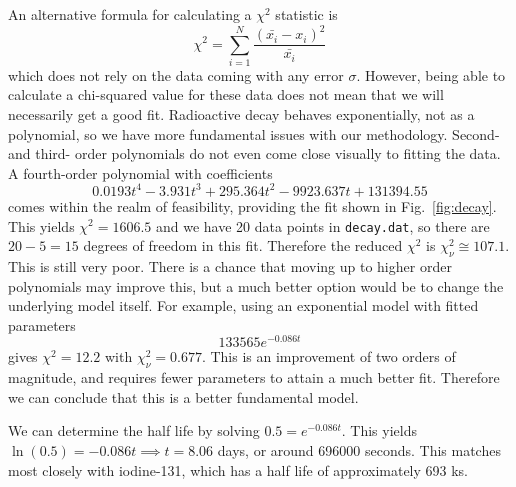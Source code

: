 \documentclass{article}
\begin{document}
\bigskip
{}
\medskip

An alternative formula for calculating a $\chi^2$ statistic is \begin{equation*}
    \chi^2 = \sum_{i=1}^N \frac{(\bar{x_i}-x_i)^2}{\bar{x_i}}
\end{equation*}
which does not rely on the data coming with any error $\sigma$. However, being able to calculate a chi-squared value for these data does not mean that we will necessarily get a good fit. Radioactive decay behaves exponentially, not as a polynomial, so we have more fundamental issues with our methodology. Second- and third- order polynomials do not even come close visually to fitting the data. A fourth-order polynomial with coefficients \begin{equation*}
    0.0193t^4 - 3.931t^3 + 295.364t^2 - 9923.637t + 131394.55
\end{equation*}
comes within the realm of feasibility, providing the fit shown in Fig.~\ref{fig:decay}. This yields $\chi^2=1606.5$ and we have 20 data points in \texttt{decay.dat}, so there are $20-5=15$ degrees of freedom in this fit. Therefore the reduced $\chi^2$ is $\chi_\nu^2 \cong 107.1$. This is still very poor. There is a chance that moving up to higher order polynomials may improve this, but a much better option would be to change the underlying model itself. For example, using an exponential model with fitted parameters \begin{equation*}
    133565e^{-0.086t}
\end{equation*}
gives $\chi^2=12.2$ with $\chi_\nu^2 = 0.677$. This is an improvement of two orders of magnitude, and requires fewer parameters to attain a much better fit. Therefore we can conclude that this is a better fundamental model. 

We can determine the half life by solving $\displaystyle 0.5 = e^{-0.086t}$. This yields $\ln(0.5)=-0.086t \implies t = 8.06$ days, or around 696000 seconds. This matches most closely with iodine-131, which has a half life of approximately 693 ks.
\end{document}
